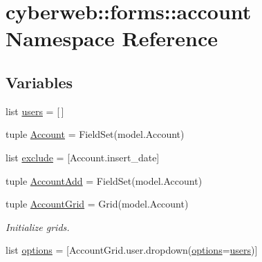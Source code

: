 \hypertarget{namespacecyberweb_1_1forms_1_1account}{\section{cyberweb\-:\-:forms\-:\-:account \-Namespace \-Reference}
\label{namespacecyberweb_1_1forms_1_1account}
}
\subsection*{\-Variables}
\begin{DoxyCompactItemize}
\item 
list \hyperlink{namespacecyberweb_1_1forms_1_1account_a4d7f9a56e88e81cd9d749854f8a6e5db}{users} = \mbox{[}$\,$\mbox{]}
\item 
tuple \hyperlink{namespacecyberweb_1_1forms_1_1account_a95b331bccadb1c7f22dc04a0f247e75a}{\-Account} = \-Field\-Set(model.\-Account)
\item 
list \hyperlink{namespacecyberweb_1_1forms_1_1account_a9dec2ac1afd53584ac0f86cbf044b675}{exclude} = \mbox{[}\-Account.\-insert\-\_\-date\mbox{]}
\item 
tuple \hyperlink{namespacecyberweb_1_1forms_1_1account_ad0f68217fd2f32a31a306c8a938c9de3}{\-Account\-Add} = \-Field\-Set(model.\-Account)
\item 
tuple \hyperlink{namespacecyberweb_1_1forms_1_1account_afba7ce0aad975725268d6e15fb963662}{\-Account\-Grid} = \-Grid(model.\-Account)
\begin{DoxyCompactList}\small\item\em \-Initialize grids. \end{DoxyCompactList}\item 
list \hyperlink{namespacecyberweb_1_1forms_1_1account_a5d676814f600d2415975d44a0b6ad9ea}{options} = \mbox{[}\-Account\-Grid.\-user.\-dropdown(\hyperlink{namespacecyberweb_1_1forms_1_1account_a5d676814f600d2415975d44a0b6ad9ea}{options}=\hyperlink{namespacecyberweb_1_1forms_1_1account_a4d7f9a56e88e81cd9d749854f8a6e5db}{users})\mbox{]}
\end{DoxyCompactItemize}


